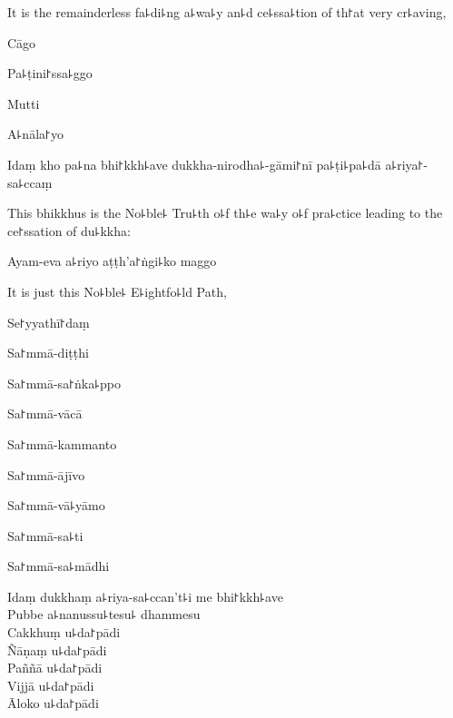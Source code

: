 \begin{english}
  It is the remainderless fa꜕di꜕ng a꜕wa꜕y an꜕d ce꜕ssa꜕tion of th꜓at very cr꜕aving,
\end{english}

Cāgo


Pa꜕ṭini꜓ssa꜕ggo


Mutti


A꜕nāla꜓yo


\ifaivedition
\clearpage
\fi

Idaṃ kho pa꜕na bhi꜓kkh꜕ave dukkha-nirodha꜕-gāmi꜓nī pa꜕ṭi꜕pa꜕dā a꜕riya꜓-sa꜕ccaṃ

\begin{english}
  This bhikkhus is the No꜕ble꜕ Tru꜕th o꜕f th꜕e wa꜕y o꜕f pra꜕ctice leading to the ce꜓ssation of du꜕kkha:
\end{english}

Ayam-eva a꜕riyo aṭṭh'a꜓ṅgi꜕ko maggo

\begin{english}
  It is just this No꜕ble꜕ E꜕ightfo꜕ld Path,
\end{english}

Se꜓yyathī꜓daṃ


Sa꜓mmā-diṭṭhi


Sa꜓mmā-sa꜓ṅka꜕ppo


Sa꜓mmā-vācā


Sa꜓mmā-kammanto


Sa꜓mmā-ājīvo


Sa꜓mmā-vā꜕yāmo


Sa꜓mmā-sa꜕ti


Sa꜓mmā-sa꜕mādhi


Idaṃ dukkhaṃ a꜕riya-sa꜕ccan't꜕i me bhi꜓kkh꜕ave\\
Pubbe a꜕nanussu꜕tesu꜕ dhammesu\\
Cakkhuṃ u꜕da꜓pādi\\
Ñāṇaṃ u꜕da꜓pādi\\
Paññā u꜕da꜓pādi\\
Vijjā u꜕da꜓pādi\\
Āloko u꜕da꜓pādi

